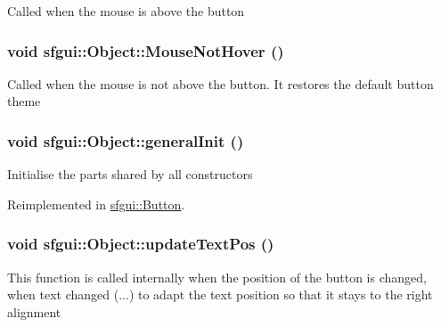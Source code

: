 Called when the mouse is above the button \hypertarget{classsfgui_1_1Object_24575661efb4ab88be76eb2e1a4947e6}{
\subsubsection[MouseNotHover]{\setlength{\rightskip}{0pt plus 5cm}void sfgui::Object::MouseNotHover ()}}
\label{classsfgui_1_1Object_24575661efb4ab88be76eb2e1a4947e6}




Called when the mouse is not above the button. It restores the default button theme \hypertarget{classsfgui_1_1Object_d2750b3d51a3a208739ed6c0c57df6aa}{
\subsubsection[generalInit]{\setlength{\rightskip}{0pt plus 5cm}void sfgui::Object::generalInit ()}}
\label{classsfgui_1_1Object_d2750b3d51a3a208739ed6c0c57df6aa}




Initialise the parts shared by all constructors 

Reimplemented in \hyperlink{classsfgui_1_1Button_59849e58ed4c46061d71f7172cab4e4e}{sfgui::Button}.\hypertarget{classsfgui_1_1Object_27d9eb8b653f263f76b612cd77512321}{
\subsubsection[updateTextPos]{\setlength{\rightskip}{0pt plus 5cm}void sfgui::Object::updateTextPos ()}}
\label{classsfgui_1_1Object_27d9eb8b653f263f76b612cd77512321}




This function is called internally when the position of the button is changed, when text changed (...) to adapt the text position so that it stays to the right alignment 

